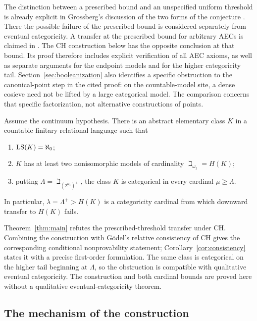 The distinction between a prescribed bound and an unspecified uniform
threshold is already explicit in Grossberg's discussion of the two
forms of the conjecture \cite[Chapter~2, Section~4, Conjectures~4.4--4.6]{Grossberg2021Draft}.
There the possible failure of the prescribed bound is considered
separately from eventual categoricity. A transfer at the prescribed
bound for arbitrary AECs is claimed in
\cite[Theorem~4.1]{Espindola2023Spectra}. The CH construction below has
the opposite conclusion at that bound. Its proof therefore includes
explicit verification of all AEC axioms, as well as separate arguments
for the endpoint models and for the higher categoricity tail.
Section~\ref{sec:booleanization} also identifies a specific obstruction
to the canonical-point step in the cited proof: on the countable-model
site, a dense cosieve need not be lifted by a large categorical model.
The comparison concerns that specific factorization, not alternative
constructions of points.

\begin{theorem}\label{thm:main}
Assume the continuum hypothesis. There is an abstract elementary class
\(K\) in a countable finitary relational language such that
\begin{enumerate}[label=\textup{(\roman*)}]
 \item \(\operatorname{LS}(K)=\aleph_0\);
 \item \(K\) has at least two nonisomorphic models of cardinality
       \(\beth_{\omega_2}=H(K)\);
 \item putting \(\Lambda=\beth_{(2^{\aleph_1})^+}\),
       the class \(K\) is categorical in every cardinal
       \(\mu\ge\Lambda\).
\end{enumerate}
In particular, \(\lambda=\Lambda^+>H(K)\) is a categoricity cardinal
from which downward transfer to \(H(K)\) fails.
\end{theorem}

Theorem~\ref{thm:main} refutes the prescribed-threshold transfer under
CH. Combining the construction with G\"odel's relative consistency of
CH gives the corresponding conditional nonprovability statement;
Corollary~\ref{cor:consistency} states it with a precise first-order
formulation. The same class is categorical on the higher tail beginning
at \(\Lambda\), so the obstruction is compatible with qualitative
eventual categoricity. The construction and both cardinal bounds are
proved here without a qualitative eventual-categoricity theorem.

\subsection{The mechanism of the construction}


